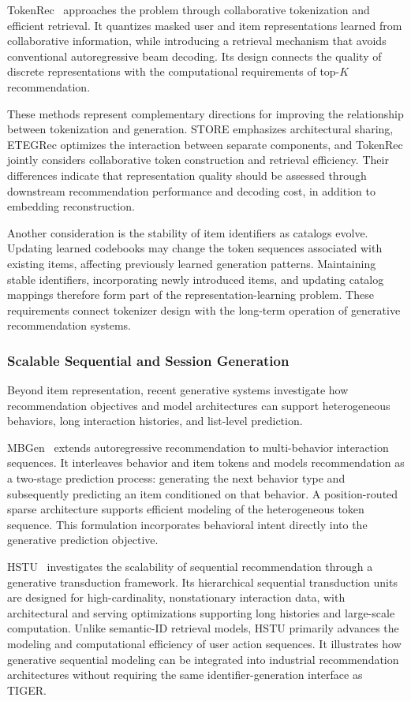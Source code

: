 \documentclass[sigconf,nonacm]{acmart}
\begin{document}
TokenRec~\cite{tokenrec} approaches the problem
through collaborative tokenization and efficient
retrieval. It quantizes masked user and item
representations learned from collaborative information,
while introducing a retrieval mechanism that avoids
conventional autoregressive beam decoding.
Its design connects the quality of discrete
representations with the computational requirements
of top-$K$ recommendation.

These methods represent complementary directions
for improving the relationship between tokenization
and generation. STORE emphasizes architectural
sharing, ETEGRec optimizes the interaction between
separate components, and TokenRec jointly considers
collaborative token construction and retrieval
efficiency. Their differences indicate that
representation quality should be assessed through
downstream recommendation performance and decoding
cost, in addition to embedding reconstruction.

Another consideration is the stability of item
identifiers as catalogs evolve. Updating learned
codebooks may change the token sequences associated
with existing items, affecting previously learned
generation patterns. Maintaining stable identifiers,
incorporating newly introduced items, and updating
catalog mappings therefore form part of the
representation-learning problem. These requirements
connect tokenizer design with the long-term
operation of generative recommendation systems.

\subsubsection{Scalable Sequential and Session Generation}

Beyond item representation, recent generative
systems investigate how recommendation objectives
and model architectures can support heterogeneous
behaviors, long interaction histories, and
list-level prediction.

MBGen~\cite{mbgen} extends autoregressive
recommendation to multi-behavior interaction
sequences. It interleaves behavior and item tokens
and models recommendation as a two-stage prediction
process: generating the next behavior type and
subsequently predicting an item conditioned on
that behavior. A position-routed sparse architecture
supports efficient modeling of the heterogeneous
token sequence. This formulation incorporates
behavioral intent directly into the generative
prediction objective.

HSTU~\cite{hstu} investigates the scalability
of sequential recommendation through a
generative transduction framework. Its hierarchical
sequential transduction units are designed for
high-cardinality, nonstationary interaction data,
with architectural and serving optimizations
supporting long histories and large-scale
computation. Unlike semantic-ID retrieval models,
HSTU primarily advances the modeling and
computational efficiency of user action sequences.
It illustrates how generative sequential modeling
can be integrated into industrial recommendation
architectures without requiring the same
identifier-generation interface as TIGER.
\end{document}
